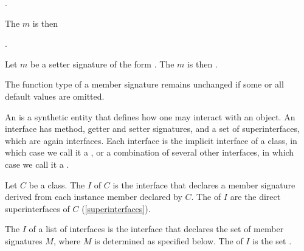 \documentclass[makeidx]{article}
\begin{document}
\noindent
{}

\noindent
{}.

\noindent
The  $m$ is then

\noindent
{}.

\LMHash{}%
Let $m$ be a setter signature of the form
.
The  $m$ is then
.

\LMHash{}%
The function type of a member signature remains unchanged if
some or all default values are omitted.


\LMHash{}%
An  is a synthetic entity that defines
how one may interact with an object.
An interface has method, getter and setter signatures,
and a set of superinterfaces,
which are again interfaces.
Each interface is the implicit interface of a class,
in which case we call it a
,
or a combination of several other interfaces,
in which case we call it a
.

\LMHash{}%
Let $C$ be a class.
The  $I$ of $C$ is the interface that declares
a member signature derived from
each instance member declared by $C$.
The  of $I$ are the direct superinterfaces of $C$
(\ref{superinterfaces}).


\LMHash{}%
The  $I$ of a list of interfaces 
is the interface that declares the set of member signatures $M$,
where $M$ is determined as specified below.
The  of $I$ is the set .
\end{document}
